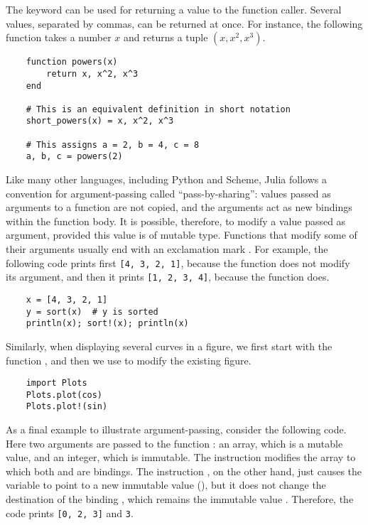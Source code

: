 The  keyword can be used for returning a value to the function caller.
Several values, separated by commas, can be returned at once.
For instance, the following function takes a number $x$ and returns a tuple $(x, x^2, x^3)$.
\begin{verbatim}
    function powers(x)
        return x, x^2, x^3
    end

    # This is an equivalent definition in short notation
    short_powers(x) = x, x^2, x^3

    # This assigns a = 2, b = 4, c = 8
    a, b, c = powers(2)
\end{verbatim}

Like many other languages,
including Python and Scheme,
Julia follows a convention for argument-passing called ``pass-by-sharing'':
values passed as arguments to a function are not copied,
and the arguments act as new bindings within the function body.
It is possible, therefore, to modify a value passed as argument,
provided this value is of mutable type.
Functions that modify some of their arguments usually end with an exclamation mark \julia{!}.
For example, the following code prints first \texttt{[4, 3, 2, 1]},
because the function  does not modify its argument,
and then it prints \texttt{[1, 2, 3, 4]},
because the function  does.
\begin{verbatim}
    x = [4, 3, 2, 1]
    y = sort(x)  # y is sorted
    println(x); sort!(x); println(x)
\end{verbatim}
Similarly,
when displaying several curves in a figure,
we first start with the function ,
and then we use  to modify the existing figure.
\begin{verbatim}
    import Plots
    Plots.plot(cos)
    Plots.plot!(sin)
\end{verbatim}

As a final example to illustrate argument-passing,
consider the following code.
Here two arguments are passed to the function :
an array, which is a mutable value,
and an integer, which is immutable.
The instruction  modifies the array to which both  and  are bindings.
The instruction ,
on the other hand, just causes the variable  to point to a new immutable value (),
but it does not change the destination of the binding , which remains the immutable value .
Therefore, the code prints \texttt{[0, 2, 3]} and \texttt{3}.

